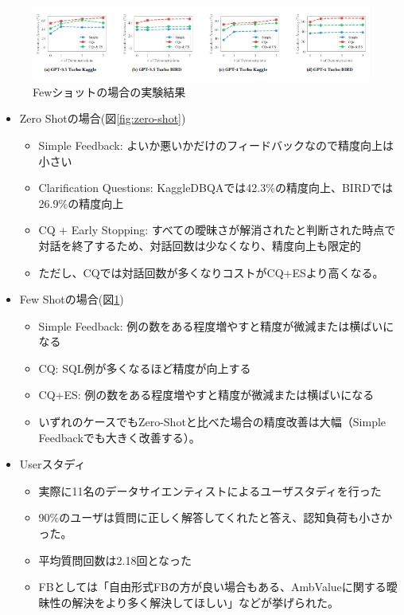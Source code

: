 \documentclass[dvipdfmx,uplatex]{jsarticle}
\theoremstyle{remark}
\newenvironment{experiment}[1]{
    \begin{tcolorbox}[
        colframe=violet,
        colback=violet!10!white,
        colbacktitle=violet!40!white,
        coltitle=black,
        fonttitle=\bfseries,
        title={#1}
    ]
}{
    \end{tcolorbox}
}
\begin{document}
\begin{figure}
    \centering
    \includegraphics[width=\textwidth]{img/sphinteract/few-shot.png}
    \caption{Fewショットの場合の実験結果}
    \label{fig:few-shot}
\end{figure}

\begin{experiment}{実験結果}
\begin{itemize}
    \item Zero Shotの場合(図\ref{fig:zero-shot})
    \begin{itemize}
        \item Simple Feedback: よいか悪いかだけのフィードバックなので精度向上は小さい
        \item Clarification Questions: KaggleDBQAでは42.3\%の精度向上、BIRDでは26.9\%の精度向上
        \item CQ + Early Stopping: すべての曖昧さが解消されたと判断された時点で対話を終了するため、対話回数は少なくなり、精度向上も限定的
        \item ただし、CQでは対話回数が多くなりコストがCQ+ESより高くなる。
    \end{itemize}
    \item Few Shotの場合(図\ref{fig:few-shot})
    \begin{itemize}
        \item Simple Feedback: 例の数をある程度増やすと精度が微減または横ばいになる
        \item CQ: SQL例が多くなるほど精度が向上する
        \item CQ+ES: 例の数をある程度増やすと精度が微減または横ばいになる
        \item いずれのケースでもZero-Shotと比べた場合の精度改善は大幅（Simple Feedbackでも大きく改善する）。
    \end{itemize}
    \item Userスタディ
    \begin{itemize}
        \item 実際に11名のデータサイエンティストによるユーザスタディを行った
        \item 90\%のユーザは質問に正しく解答してくれたと答え、認知負荷も小さかった。
        \item 平均質問回数は2.18回となった
        \item FBとしては「自由形式FBの方が良い場合もある、AmbValueに関する曖昧性の解決をより多く解決してほしい」などが挙げられた。
    \end{itemize}
\end{itemize}
\end{experiment}
\end{document}
